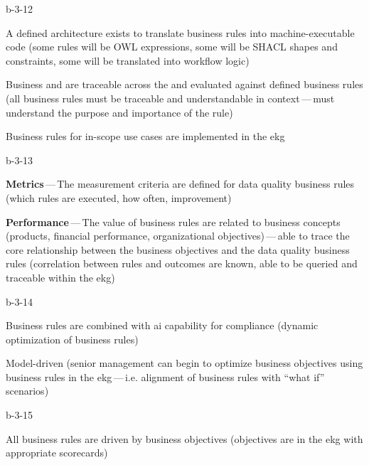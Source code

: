 \begin{level-assessment}{b-3-1}{2}

  \item A defined architecture exists to translate business rules into machine-executable code (some rules will be
        OWL expressions, some will be SHACL shapes and constraints, some will be translated into
        workflow logic)
  \item Business  and  are traceable across the  and
        evaluated against defined business rules (all business rules must be traceable and understandable in
        context\,---\,must understand the purpose and importance of the rule)
  \item Business rules for in-scope use cases are implemented in the \gls{ekg}

\end{level-assessment}

\begin{level-assessment}{b-3-1}{3}

    \item \textbf{Metrics}\,---\,The measurement criteria are defined for data quality business rules (which rules are executed,
          how often, improvement)
    \item \textbf{Performance}\,---\,The value of business rules are related to business concepts (products, financial performance,
          organizational objectives)\,---\,able to trace the core relationship between the business objectives and
          the data quality business rules (correlation between rules and outcomes are known, able to be queried and
          traceable within the \gls{ekg})

\end{level-assessment}

\begin{level-assessment}{b-3-1}{4}

    \item Business rules are combined with \gls{ai} capability for compliance (dynamic optimization of
          business rules)
    \item Model-driven (senior management can begin to optimize business objectives using business rules in
          the \gls{ekg}\,---\,i.e. alignment of business rules with “what if” scenarios)

\end{level-assessment}

\begin{level-assessment}{b-3-1}{5}

    \item All business rules are driven by business objectives (objectives are in the \gls{ekg} with appropriate scorecards)

\end{level-assessment}
